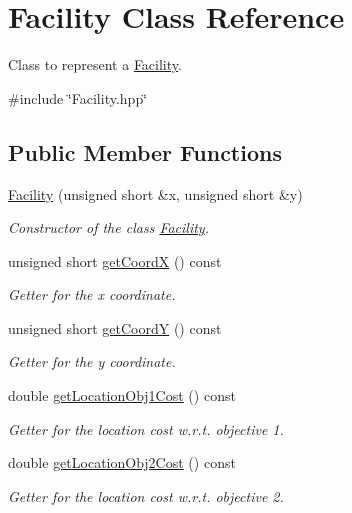 \hypertarget{classFacility}{\section{\-Facility \-Class \-Reference}
\label{classFacility}
}


\-Class to represent a {\ttfamily \hyperlink{classFacility}{\-Facility}}.  




{\ttfamily \#include \char`\"{}\-Facility.\-hpp\char`\"{}}

\subsection*{\-Public \-Member \-Functions}
\begin{DoxyCompactItemize}
\item 
\hyperlink{classFacility_a5c48d7d27d44b9ff4fae168c8c04e746}{\-Facility} (unsigned short \&x, unsigned short \&y)
\begin{DoxyCompactList}\small\item\em \-Constructor of the class {\ttfamily \hyperlink{classFacility}{\-Facility}}. \end{DoxyCompactList}\item 
unsigned short \hyperlink{classFacility_adbac1c34dd0f42ab53f2c217eeb96802}{get\-Coord\-X} () const 
\begin{DoxyCompactList}\small\item\em \-Getter for the x coordinate. \end{DoxyCompactList}\item 
unsigned short \hyperlink{classFacility_a5c2d01633f91de636e490f554f5cdc88}{get\-Coord\-Y} () const 
\begin{DoxyCompactList}\small\item\em \-Getter for the y coordinate. \end{DoxyCompactList}\item 
double \hyperlink{classFacility_ac7b6a40b6ff123f30d702328b949eae0}{get\-Location\-Obj1\-Cost} () const 
\begin{DoxyCompactList}\small\item\em \-Getter for the location cost w.\-r.\-t. objective 1. \end{DoxyCompactList}\item 
double \hyperlink{classFacility_afc8058ff54719571b23aeeb42e8de338}{get\-Location\-Obj2\-Cost} () const 
\begin{DoxyCompactList}\small\item\em \-Getter for the location cost w.\-r.\-t. objective 2. \end{DoxyCompactList}\item 

\end{DoxyCompactItemize}

